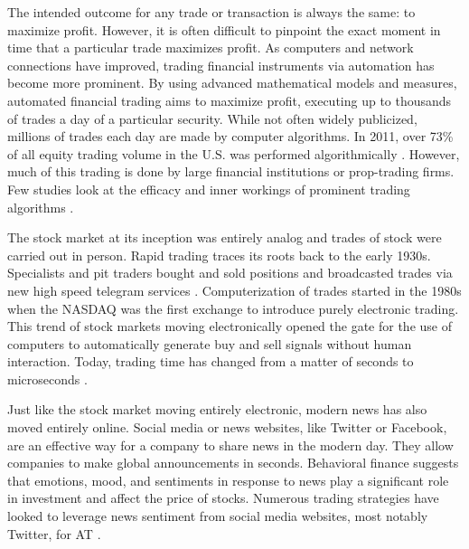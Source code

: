 \documentclass[../thesis.tex]{subfiles}
\begin{document}
 The intended outcome for any trade or transaction is always the same: to maximize profit. However, it is often difficult to pinpoint the exact moment in time that a particular trade maximizes profit. As computers and network connections have improved, trading financial instruments via automation has become more prominent. By using advanced mathematical models and measures, automated financial trading aims to maximize profit, executing up to thousands of trades a day of a particular security. While not often widely publicized, millions of trades each day are made by computer algorithms. In 2011, over 73\% of all equity trading volume in the U.S. was performed algorithmically \cite{Treleaven2013}. However, much of this trading is done by large financial institutions or prop-trading firms. Few studies look at the efficacy and inner workings of prominent trading algorithms \cite{Ehlers} \cite{Gatev2006}. 
  
The stock market at its inception was entirely analog and trades of stock were carried out in person. Rapid trading traces its roots back to the early 1930s. Specialists and pit traders bought and sold positions and broadcasted trades via new high speed telegram services \cite{Treleaven2013}.  Computerization of trades started in the 1980s when the NASDAQ was the first exchange to introduce purely electronic trading. This trend of stock markets moving electronically opened the gate for the use of computers to automatically generate buy and sell signals without human interaction. Today, trading time has changed from a matter of seconds to microseconds \cite{Treleaven2013}.

Just like the stock market moving entirely electronic, modern news has also moved entirely online. Social media or news websites, like Twitter or Facebook, are an effective way for a company to share news in the modern day. They allow companies to make global announcements in seconds. Behavioral finance suggests that emotions, mood, and sentiments in response to news play a significant role in investment and affect the price of stocks. Numerous trading strategies have looked to leverage news sentiment from social media websites, most notably Twitter, for AT \cite{Ho2016}.
 
\end{document}
